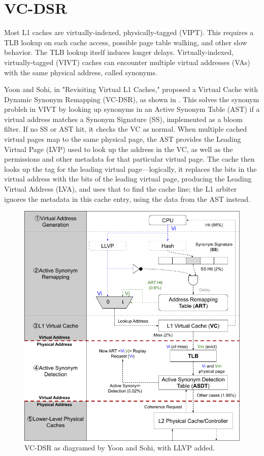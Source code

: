 \section{VC-DSR}

Most L1 caches are virtually-indexed, physically-tagged (VIPT).  This requires a TLB lookup on each cache access, possible page table walking, and other slow behavior.  The TLB lookup itself induces longer delays.  Virtually-indexed, virtually-tagged (VIVT) caches can encounter multiple virtual addresses (VAs) with the same physical address, called synonyms.

Yoon and Sohi, in "Revisiting Virtual L1 Caches," proposed a Virtual Cache with Dynamic Synonym Remapping (VC-DSR), as shown in .  This solves the synonym probleh in VIVT by looking up synonyms in an Active Synonym Table (AST) if a virtual address matches a Synonym Signature (SS), implemented as a bloom filter.  If no SS or AST hit, it checks the VC as normal.  When multiple cached virtual pages map to the same physical page, the AST provides the Leading Virtual Page (LVP) used to look up the address in the VC, as well as the permissions and other metadata for that particular virtual page.  The cache then looks up the tag for the leading virtual page—logically, it replaces the bits in the virtual address with the bits of the leading virtual page, producing the Leading Virtual Address (LVA), and uses that to find the cache line; the L1 arbiter ignores the metadata in this cache entry, using the data from the AST instead.

\begin{figure}[hbpt]
    \centering
    \includegraphics[width=\textwidth]{images/VC-DSR_Cache}
    \caption{\label{fig:VC-DSR}VC-DSR as diagramed by Yoon and Sohi, with LLVP added.}
\end{figure}

